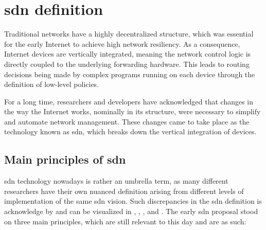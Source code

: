 \section[SDN definition]{\gls{sdn} definition}

Traditional networks have a highly decentralized structure, which was essential for the early Internet to achieve high network resiliency. As a consequence, Internet devices are vertically integrated, meaning the network control logic is directly coupled to the underlying forwarding hardware. This leads to routing decisions being made by complex programs running on each device through the definition of low-level policies\cite{bifulco_survey_2018}. 

For a long time, researchers and developers have acknowledged that changes in the way the Internet works, nominally in its structure, were necessary to simplify and automate network management. These changes came to take place as the technology known as \gls{sdn}, which breaks down the vertical integration of devices\cite{thyagaturu_software_2016}.  

\subsection[Main principles of SDN]{Main principles of \gls{sdn}}
\gls{sdn} technology nowadays is rather an umbrella term, as many different researchers have their own nuanced definition arising from different levels of implementation of the same \gls{sdn} vision. Such discrepancies in the \gls{sdn} definition is acknowledge by \cite{peterson_software-defined_2021} and can be visualized in \cite{feamster_road_2013}, \cite{thyagaturu_software_2016}, \cite{nunes_survey_2014}, and \cite{bifulco_survey_2018}.
The early \gls{sdn} proposal stood on three main principles, which are still relevant to this day and are as such:

